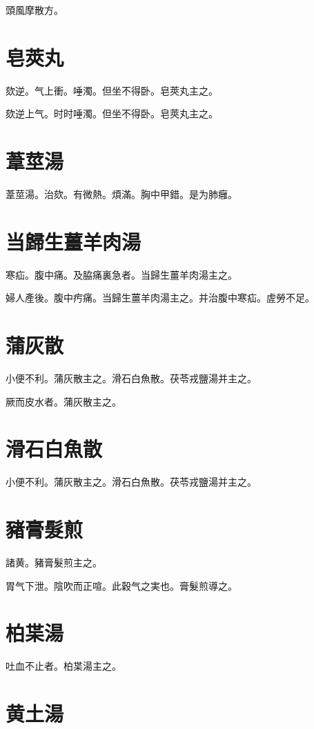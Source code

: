 頭風摩散方。

\section{皂莢丸}

欬逆。气上衝。唾濁。但坐不得卧。皂莢丸主之。{\wuben}

欬逆上气。时时唾濁。但坐不得卧。皂莢丸主之。{\dengben}

\section{葦莖湯}

葦莖湯。治欬。有微熱。煩滿。胸中甲錯。是为肺癰。

\section{当歸生薑羊肉湯}

寒疝。腹中痛。及脇痛裏急者。当歸生薑羊肉湯主之。

{\khaaitp 婦人}產後。腹中㽲痛。当歸生薑羊肉湯主之。并治腹中寒疝。虗勞不足。

\section{蒲灰散}

小便不利。蒲灰散主之。滑石白魚散。茯苓戎鹽湯并主之。

厥而皮水者。蒲灰散主之。

\section{滑石白魚散}

小便不利。蒲灰散主之。滑石白魚散。茯苓戎鹽湯并主之。

\section{豬膏髮煎}

諸黄。豬膏髮煎主之。

胃气下泄。陰吹而正喧。此穀气之実也。膏髮煎導之。

\section{柏枼湯}

吐血不止者。柏枼湯主之。

\section{黄土湯}

